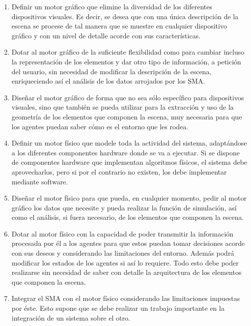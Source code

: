 \documentclass[runningheads]{llncs}
\begin{document}
\begin{enumerate}
    \item Definir un motor gráfico que elimine la diversidad de los diferentes dispositivos visuales. Es decir, se desea que con una única descripción de la escena se procese de tal manera que se muestre en cualquier dispositivo gráfico y con un nivel de detalle acorde con sus características.

    \item Dotar al motor gráfico de la suficiente flexibilidad como para cambiar incluso la representación de los elementos y dar otro tipo de información, a petición del usuario, sin necesidad de modificar la descripción de la escena, enriqueciendo así el análisis de los datos arrojados por los SMA.

    \item Diseñar el motor gráfico de forma que no sea sólo específico para dispositivos visuales, sino que también se pueda utilizar para la extracción y uso de la geometría de los elementos que componen la escena, muy necesaria para que los agentes puedan saber cómo es el entorno que les rodea.

    \item Definir un motor físico que modele toda la actividad del sistema, adaptándose a los diferentes componentes hardware donde se va a ejecutar. Si se dispone de componentes hardware que implementan algoritmos físicos, el sistema debe aprovecharlos, pero si por el contrario no existen, los debe implementar mediante software.

    \item Diseñar el motor físico para que pueda, en cualquier momento, pedir al motor gráfico los datos que necesite y pueda realizar la función de simulación, así como el análisis, si fuera necesario, de los elementos que componen la escena. 

    \item Dotar al motor físico con la capacidad de poder transmitir la información procesada por él a los agentes para que estos puedan tomar decisiones acorde con sus deseos y considerando las limitaciones del entorno. Además podrá modificar los estados de los agentes si así lo requiere. Todo esto debe poder realizarse sin necesidad de saber con detalle la arquitectura de los elementos que componen la escena.

    \item Integrar el SMA con el motor físico considerando las limitaciones impuestas por éste. Esto supone que se debe realizar un trabajo importante en la integración de un sistema sobre el otro.


\end{enumerate}
\end{document}
